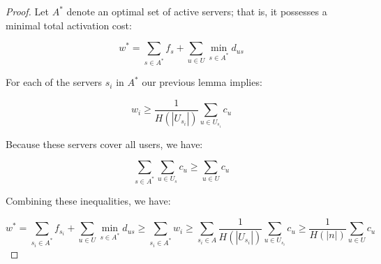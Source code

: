 \documentclass[12pt]{article}
\begin{document}
\begin{proof}
Let $A^*$ denote an optimal set of active servers; that is, it possesses
a minimal total activation cost:

\begin{displaymath}
w^* = \sum_{s \in A^*} f_s + \sum_{u \in U}\min_{s\in A^*}d_{us}
\end{displaymath}

For each of the servers $s_i$ in $A^*$ our previous lemma implies:

\begin{displaymath}
w_i \ge \frac{1}{H(|U_{s_i}|)}\sum_{u \in U_{s_i}}c_u
\end{displaymath}

Because these servers cover all users, we have:

\begin{displaymath}
\sum_{s \in A^*} \sum_{u \in U_{s}} c_u \ge \sum_{u \in U} c_u
\end{displaymath}



Combining these inequalities, we have:

\begin{displaymath}
w^* = \sum_{s_i \in A^*} f_{s_i} + \sum_{u \in U}\min_{s \in A^*}d_{us} \ge
\sum_{s_i \in A^*} w_i \ge \sum_{s_i \in A} \frac{1}{H(|U_{s_i}|)}\sum_{u \in U_{s_i}}c_u \ge \frac{1}{H(|n|)}\sum_{u \in U}c_u
\end{displaymath}

\end{proof}

\end{document}

